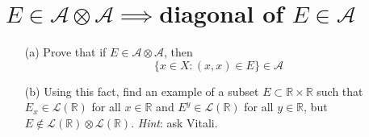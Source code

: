 \documentclass[lang=cn,11pt]{elegantbook}
\begin{document}
\section{$E\in\mathcal{A}\otimes\mathcal{A} \implies $diagonal of $E \in \mathcal{A}$}
  \begin{itemize}
  \item[(a)]Prove that if $E\in\mathcal{A}\otimes\mathcal{A}$, then  \[
      \{ x\in X: (x,x)\in E\} \in \mathcal{A}
    \]
  \item[(b)]Using this fact, find an example of a subset $E\subset \mathbb{R}\times \mathbb{R}$ such that $E_x\in \mathcal{L}(\mathbb{R})$ for all $x\in \mathbb{R}$ and $E^y\in \mathcal{L}(\mathbb{R})$ for all $y\in \mathbb{R}$, but $E\notin \mathcal{L}(\mathbb{R})\otimes  \mathcal{L}(\mathbb{R})$.
    \textit{Hint}: ask Vitali.
  \end{itemize}
\end{document}
